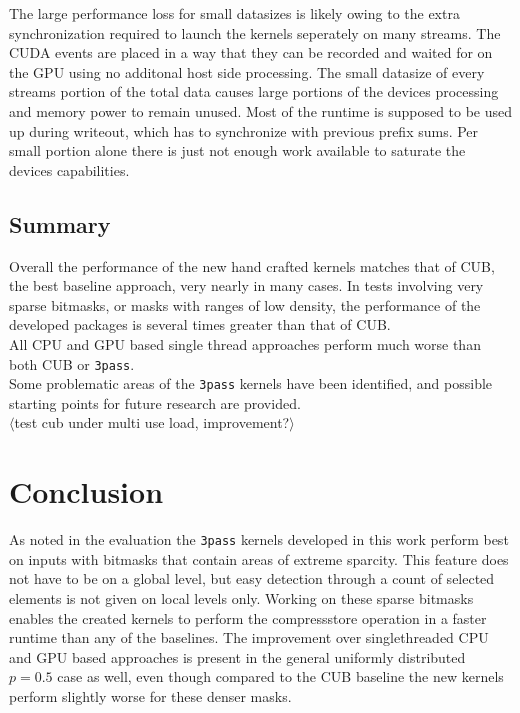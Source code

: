 \documentclass{tudscrreprt}
\newcommand{\markr}[1]{\textcolor{review}{$\langle$#1$\rangle$}}
\begin{document}
			The large performance loss for small datasizes is likely owing to the extra synchronization required to launch the kernels seperately on many streams. The CUDA events are placed in a way that they can be recorded and waited for on the GPU using no additonal host side processing. The small datasize of every streams portion of the total data causes large portions of the devices processing and memory power to remain unused. Most of the runtime is supposed to be used up during writeout, which has to synchronize with previous prefix sums. Per small portion alone there is just not enough work available to saturate the devices capabilities. \\
		
		\section{Summary}
			Overall the performance of the new hand crafted kernels matches that of CUB, the best baseline approach, very nearly in many cases. In tests involving very sparse bitmasks, or masks with ranges of low density, the performance of the developed packages is several times greater than that of CUB. \\
			All CPU and GPU based single thread approaches perform much worse than both CUB or \texttt{3pass}. \\
			
			Some problematic areas of the \texttt{3pass} kernels have been identified, and possible starting points for future research are provided. \\
			
			\markr{test cub under multi use load, improvement?}\\
		
	\chapter{Conclusion}
		As noted in the evaluation the \texttt{3pass} kernels developed in this work perform best on inputs with bitmasks that contain areas of extreme sparcity. This feature does not have to be on a global level, but easy detection through a count of selected elements is not given on local levels only. Working on these sparse bitmasks enables the created kernels to perform the compressstore operation in a faster runtime than any of the baselines. The improvement over singlethreaded CPU and GPU based approaches is present in the general uniformly distributed $p=0.5$ case as well, even though compared to the CUB baseline the new kernels perform slightly worse for these denser masks. \\
		
\end{document}
